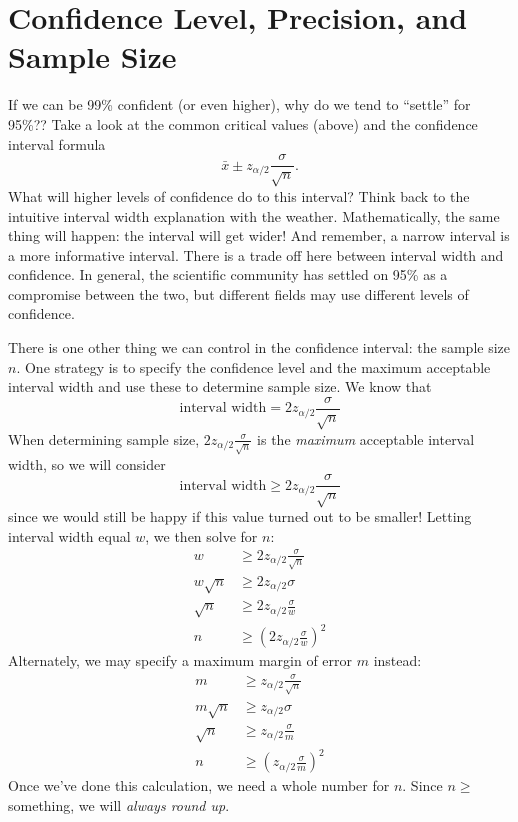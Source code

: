 \documentclass[
]{book}
\begin{document}
\section{Confidence Level, Precision, and Sample Size}\label{confidence-level-precision-and-sample-size}

If we can be 99\% confident (or even higher), why do we tend to ``settle'' for 95\%?? Take a look at the common critical values (above) and the confidence interval formula \[\bar{x} \pm z_{\alpha/2}\frac{\sigma}{\sqrt{n}}.\] What will higher levels of confidence do to this interval? Think back to the intuitive interval width explanation with the weather. Mathematically, the same thing will happen: the interval will get wider! And remember, a narrow interval is a more informative interval. There is a trade off here between interval width and confidence. In general, the scientific community has settled on 95\% as a compromise between the two, but different fields may use different levels of confidence.

There is one other thing we can control in the confidence interval: the sample size \(n\). One strategy is to specify the confidence level and the maximum acceptable interval width and use these to determine sample size. We know that \[\text{interval width} = 2z_{\alpha/2}\frac{\sigma}{\sqrt{n}}\] When determining sample size, \(2z_{\alpha/2}\frac{\sigma}{\sqrt{n}}\) is the \emph{maximum} acceptable interval width, so we will consider \[\text{interval width} \ge 2z_{\alpha/2}\frac{\sigma}{\sqrt{n}}\] since we would still be happy if this value turned out to be smaller! Letting interval width equal \(w\), we then solve for \(n\):
\[\begin{aligned}
  w &\ge 2z_{\alpha/2}\frac{\sigma}{\sqrt{n}} \\
  w\sqrt{n} &\ge 2z_{\alpha/2}\sigma \\
  \sqrt{n} &\ge 2z_{\alpha/2}\frac{\sigma}{w} \\
  n &\ge \left(2z_{\alpha/2}\frac{\sigma}{w}\right)^2
\end{aligned}\]
Alternately, we may specify a maximum margin of error \(m\) instead:
\[
  \begin{aligned}
  m &\ge z_{\alpha/2}\frac{\sigma}{\sqrt{n}} \\
  m\sqrt{n} &\ge z_{\alpha/2}\sigma \\
  \sqrt{n} &\ge z_{\alpha/2}\frac{\sigma}{m} \\
  n &\ge \left(z_{\alpha/2}\frac{\sigma}{m}\right)^2
\end{aligned}
\]
Once we've done this calculation, we need a whole number for \(n\). Since \(n \ge\) something, we will \emph{always round up}.
\end{document}
